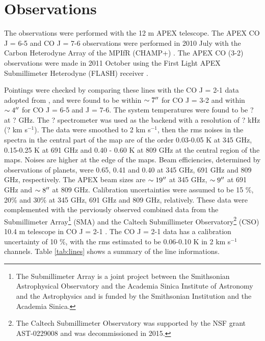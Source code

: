 \section{Observations}

The observations were performed with the 12 m APEX telescope. The APEX CO J = 6-5 and CO J = 7-6 observations were
performed in 2010 July with the Carbon Heterodyne Array of the MPIfR (CHAMP+) \citep{2006SPIE.6275E..0NK}. The APEX CO (3-2) observations were made in 2011 October using the First Light APEX Submillimeter Heterodyne (FLASH) receiver \citep{2006A&A...454L..21H}.

Pointings were checked by comparing these lines with the CO J = 2-1 data adopted from \citet{2009ApJ...696...66Q}, and were found to be within $\sim 7\mbox{$^{\prime\prime}$}$ for CO J = 3-2 and within $\sim 4\mbox{$^{\prime\prime}$}$ for CO J = 6-5 and J = 7-6. The system temperatures were found to be ? at ? GHz. The ? spectrometer was used as the backend with a resolution of ? kHz (? km s$^{-1}$). The data were smoothed to 2 km s$^{-1}$, then the rms noises in the spectra in the central part of the map are of the order 0.03-0.05 K at 345 GHz, 0.15-0.25 K at 691 GHz and 0.40 - 0.60 K at 809 GHz at the central region of the maps. Noises are higher at the edge of the maps. Beam efficiencies, determined by observations of planets, were 0.65, 0.41 and 0.40 at 345 GHz, 691 GHz and 809 GHz, respectively. The APEX beam sizes are $\sim 19\mbox{$^{\prime\prime}$}$ at 345 GHz, $\sim 9\mbox{$^{\prime\prime}$}$ at 691 GHz and $\sim 8\mbox{$^{\prime\prime}$}$ at 809 GHz. Calibration uncertainties were assumed to be 15 \%, 20\% and 30\% at 345 GHz, 691 GHz and 809 GHz, relatively. These data were complemented with the perviously observed combined data from the Submillimeter Array\footnote{    The Submillimeter Array is a joint project between the Smithsonian Astrophysical Observatory and the Academia Sinica Institute of Astronomy and the Astrophysics and is funded by the Smithsonian Institution and the Academia Sinica.} (SMA) and the Caltech Submillimeter Observatory\footnote{    The Caltech Submillimeter Observatory was supported by the NSF grant AST-0229008 and was decommissioned in 2015.} (CSO) 10.4 m telescope in CO J = 2-1 \citep{2009ApJ...696...66Q}. The CO J = 2-1 data has a calibration uncertainty of 10 \%, with the rms estimated to be 0.06-0.10 K in 2 km s$^{-1}$ channels. Table \ref{tab:lines} shows a summary of the line informations.

